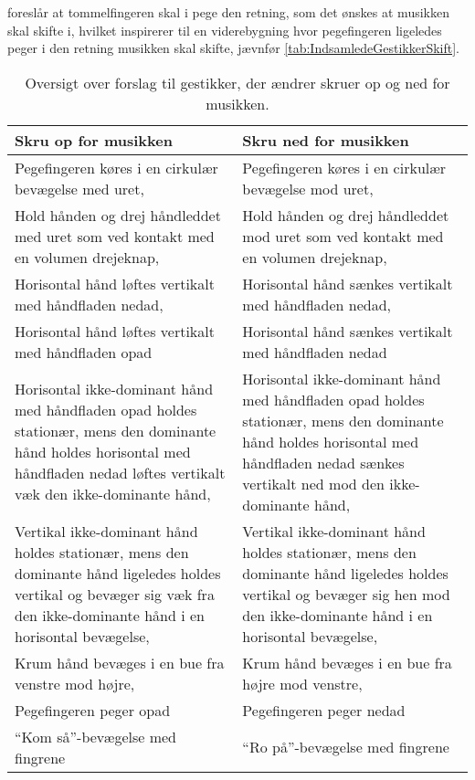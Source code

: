\textcite[s. 166]{PDF:ComparingInputModalities} foreslår at tommelfingeren skal i pege den retning, som det ønskes at musikken skal skifte i, hvilket inspirerer til en viderebygning hvor pegefingeren ligeledes peger i den retning musikken skal skifte, jævnfør \autoref{tab:IndsamledeGestikkerSkift}.            
%
\begin{table}[H]
	\centering
	\begin{tabular}{| p{6cm} | p{6cm} |}
		\hline
		\textbf{Skru op for musikken} & \textbf{Skru ned for musikken} \\ \hline
		Pegefingeren køres i en cirkulær bevægelse med uret, \parencite{WEB:BeosoundMoment, WEB:BMW7} & Pegefingeren køres i en cirkulær bevægelse mod uret, \parencite{WEB:BeosoundMoment, WEB:BMW7} \\ \hline
		Hold hånden og drej håndleddet med uret som ved kontakt med en volumen drejeknap, \parencite{WEB:Beosound2} & Hold hånden og drej håndleddet mod uret som ved kontakt med en volumen drejeknap, \parencite{WEB:Beosound2} \\ \hline
		Horisontal hånd løftes vertikalt med håndfladen nedad, \parencite[s. 166]{PDF:ComparingInputModalities} & Horisontal hånd sænkes vertikalt med håndfladen nedad, \parencite[s. 166]{PDF:ComparingInputModalities} \\ \hline
		Horisontal hånd løftes vertikalt med håndfladen opad & Horisontal hånd sænkes vertikalt med håndfladen nedad \\ \hline
		Horisontal ikke-dominant hånd med håndfladen opad holdes stationær, mens den dominante hånd holdes horisontal med håndfladen nedad løftes vertikalt væk den ikke-dominante hånd, \parencite[s. 48]{PDF:UserDefinedGesturesTV} & Horisontal ikke-dominant hånd med håndfladen opad holdes stationær, mens den dominante hånd holdes horisontal med håndfladen nedad sænkes vertikalt ned mod den ikke-dominante hånd, \parencite[s. 48]{PDF:UserDefinedGesturesTV} \\ \hline
		Vertikal ikke-dominant hånd holdes stationær, mens den dominante hånd ligeledes holdes vertikal og bevæger sig væk fra den ikke-dominante hånd i en horisontal bevægelse, \parencite[s. 48]{PDF:UserDefinedGesturesTV} & Vertikal ikke-dominant hånd holdes stationær, mens den dominante hånd ligeledes holdes vertikal og bevæger sig hen mod den ikke-dominante hånd i en horisontal bevægelse, \parencite[s. 48]{PDF:UserDefinedGesturesTV} \\ \hline
		Krum hånd bevæges i en bue fra venstre mod højre, \parencite{WEB:BeoplayA9} & Krum hånd bevæges i en bue fra højre mod venstre, \parencite{WEB:BeoplayA9} \\ \hline
		Pegefingeren peger opad & Pegefingeren peger nedad \\ \hline
		\enquote{Kom så}-bevægelse med fingrene & \enquote{Ro på}-bevægelse med fingrene \\ \hline		
	\end{tabular}
	\caption{Oversigt over forslag til gestikker, der ændrer skruer op og ned for musikken.}
	\label{tab:IndsamledeGestikkerVolumen}
\end{table}
